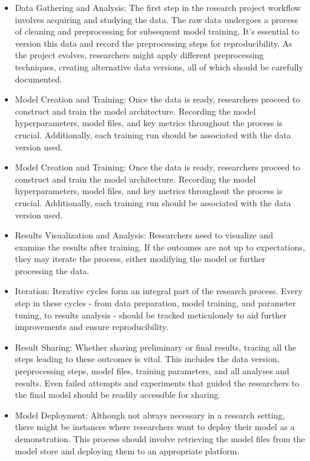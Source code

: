 \begin{itemize}
    \item Data Gathering and Analysis: The first step in the research project workflow involves acquiring and studying the data. The raw data undergoes a process of cleaning and preprocessing for subsequent model training. It's essential to version this data and record the preprocessing steps for reproducibility. As the project evolves, researchers might apply different preprocessing techniques, creating alternative data versions, all of which should be carefully documented.
    \item Model Creation and Training: Once the data is ready, researchers proceed to construct and train the model architecture. Recording the model hyperparameters, model files, and key metrics throughout the process is crucial. Additionally, each training run should be associated with the data version used.
    \item Model Creation and Training: Once the data is ready, researchers proceed to construct and train the model architecture. Recording the model hyperparameters, model files, and key metrics throughout the process is crucial. Additionally, each training run should be associated with the data version used.
    \item Results Visualization and Analysis: Researchers need to visualize and examine the results after training. If the outcomes are not up to expectations, they may iterate the process, either modifying the model or further processing the data.
    \item Iteration: Iterative cycles form an integral part of the research process. Every step in these cycles - from data preparation, model training, and parameter tuning, to results analysis - should be tracked meticulously to aid further improvements and ensure reproducibility.
    \item Result Sharing: Whether sharing preliminary or final results, tracing all the steps leading to these outcomes is vital. This includes the data version, preprocessing steps, model files, training parameters, and all analyses and results. Even failed attempts and experiments that guided the researchers to the final model should be readily accessible for sharing.
    \item Model Deployment: Although not always necessary in a research setting, there might be instances where researchers want to deploy their model as a demonstration. This process should involve retrieving the model files from the model store and deploying them to an appropriate platform.
\end{itemize}

